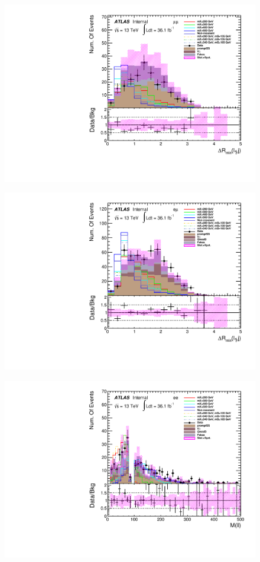 \begin{figure}[h]
\begin{minipage}[t]{0.33\linewidth}
 \includegraphics[width=1.0\textwidth,angle=-90]{fig/dataMC_high_Njet_CR/mindR_l1j_mumu.pdf}\label{fig:dataMC_high_Njet_CR:mindRl1j_mumu.pdf}
 \end{minipage}
  \begin{minipage}[t]{0.33\linewidth}
 \centering
 \includegraphics[width=1.0\textwidth,angle=-90]{fig/dataMC_high_Njet_CR/mindR_l1j_emu.pdf}\label{fig:dataMC_high_Njet_CR:mindRl1j_emu.pdf}
 \end{minipage}
\begin{minipage}[t]{0.33\linewidth}
 \centering
 \includegraphics[width=1.0\textwidth,angle=-90]{fig/dataMC_high_Njet_CR/m_ll_ee.pdf}

\end{minipage}
\end{figure}

